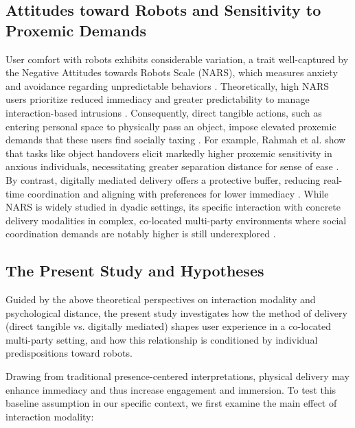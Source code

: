 \documentclass[sigconf,screen]{acmart-tagged}
\begin{document}
\vspace{-6pt}
\subsection{Attitudes toward Robots and Sensitivity to Proxemic Demands}
User comfort with robots exhibits considerable variation, a trait well-captured by the Negative Attitudes towards Robots Scale (NARS), which measures anxiety and avoidance regarding unpredictable behaviors \cite{nomura2006measurement, ivaldi2015towards, naneva2020systematic}. Theoretically, high NARS users prioritize reduced immediacy and greater predictability to manage interaction-based intrusions \cite{syrdal2009negative, nomura2006measurement, niewrzol2024development}. Consequently, direct tangible actions, such as entering personal space to physically pass an object, impose elevated proxemic demands that these users find socially taxing \cite{rahmah2025modeling, nenna2024addressing, miller2021more, obaid2016stop}. For example, Rahmah et al. show that tasks like object handovers elicit markedly higher proxemic sensitivity in anxious individuals, necessitating greater separation distance for sense of ease \cite{rahmah2025modeling}. By contrast, digitally mediated delivery offers a protective buffer, reducing real-time coordination and aligning with preferences for lower immediacy \cite{gittens2024remote, seo2025evaluating, van2022impact}. While NARS is widely studied in dyadic settings, its specific interaction with concrete delivery modalities in complex, co-located multi-party environments where social coordination demands are notably higher is still underexplored \cite{nigro2025social, muller2024egocentric, amirova202110}.

\vspace{-8pt}
\subsection{The Present Study and Hypotheses}
Guided by the above theoretical perspectives on interaction modality and psychological distance, the present study investigates how the method of delivery (direct tangible vs. digitally mediated) shapes user experience in a co-located multi-party setting, and how this relationship is conditioned by individual predispositions toward robots.

Drawing from traditional presence-centered interpretations, physical delivery may enhance immediacy and thus increase engagement and immersion. To test this baseline assumption in our specific context, we first examine the main effect of interaction modality:
\end{document}
